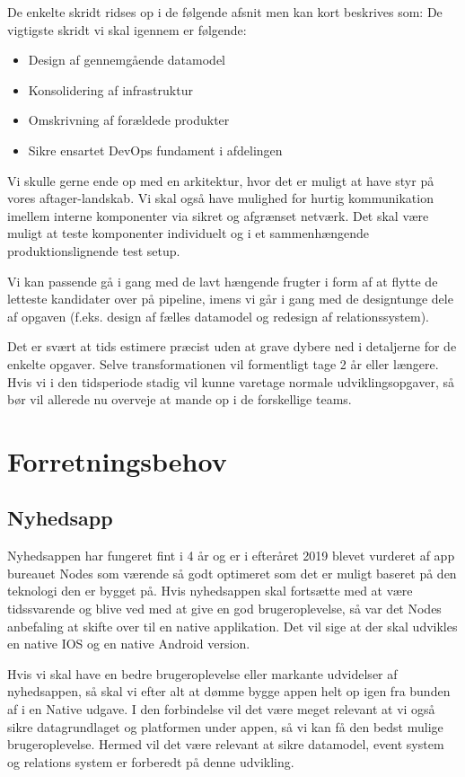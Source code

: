 \documentclass{article}
\begin{document}
De enkelte skridt ridses op i de følgende afsnit men kan kort beskrives som:
De vigtigste skridt vi skal igennem er følgende:
\begin{itemize}
\item Design af gennemgående datamodel
\item Konsolidering af infrastruktur
\item Omskrivning af forældede produkter
\item Sikre ensartet DevOps fundament i afdelingen
\end{itemize}
Vi skulle gerne ende op med en arkitektur, hvor det er muligt at have styr på vores aftager-landskab. Vi skal også have mulighed for hurtig kommunikation imellem interne komponenter via sikret og afgrænset netværk. Det skal være muligt at teste komponenter individuelt og i et sammenhængende produktionslignende test setup.

Vi kan passende gå i gang med de lavt hængende frugter i form af at flytte de letteste kandidater over på pipeline, imens vi går i gang med de designtunge dele af opgaven (f.eks. design af fælles datamodel og redesign af relationssystem).

Det er svært at tids estimere præcist uden at grave dybere ned i detaljerne for de enkelte opgaver. Selve transformationen vil formentligt tage 2 år eller længere. Hvis vi i den tidsperiode stadig vil kunne varetage normale udviklingsopgaver, så bør vil allerede nu overveje at mande op i de forskellige teams.

\section{Forretningsbehov}

\subsection{Nyhedsapp}
Nyhedsappen har fungeret fint i 4 år og er i efteråret 2019 blevet vurderet af app bureauet Nodes som værende så godt optimeret som det er muligt baseret på den teknologi den er bygget på. Hvis nyhedsappen skal fortsætte med at være tidssvarende og blive ved med at give en god brugeroplevelse, så var det Nodes anbefaling at skifte over til en native applikation. Det vil sige at der skal udvikles en native IOS og en native Android version.

Hvis vi skal have en bedre brugeroplevelse eller markante udvidelser af nyhedsappen, så skal vi efter alt at dømme bygge appen helt op igen fra bunden af i en Native udgave. I den forbindelse vil det være meget relevant at vi også sikre datagrundlaget og platformen under appen, så vi kan få den bedst mulige brugeroplevelse.
Hermed vil det være relevant at sikre datamodel, event system og relations system er forberedt på denne udvikling.
\end{document}
